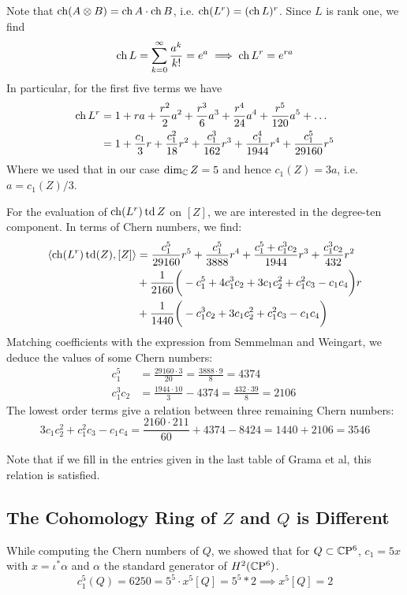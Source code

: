 \documentclass{scrartcl}
\begin{document}
Note that $\operatorname{ch}(A\otimes B)=\operatorname{ch} A\cdot \operatorname{ch} B$, i.e. $\operatorname{ch} (L^r)=(\operatorname{ch} L)^r$. Since $L$ is rank one, we find
\begin{equation*}
\operatorname{ch} L=\sum_{k=0}^\infty \frac{a^k}{k!}=e^a\implies \operatorname{ch} L^r=e^{ra}
\end{equation*}
In particular, for the first five terms we have
\begin{align*}
	\operatorname{ch} L^r&=1+ra+\frac{r^2}{2}a^2+\frac{r^3}{6}a^3
	+\frac{r^4}{24}a^4+\frac{r^5}{120}a^5+\dots\\
	&=1+\frac{c_1}{3}r+\frac{c_1^2}{18}r^2+\frac{c_1^3}{162}r^3
	+\frac{c_1^4}{1944}r^4+\frac{c_1^5}{29160}r^5
\end{align*}
Where we used that in our case $\dim_{\mathbb{C}} Z=5$ and hence $c_1(Z)=3a$, i.e. $a=c_1(Z)/3$.

For the evaluation of $\operatorname{ch}(L^r)\operatorname{td} Z$ on $[Z]$, we are interested in the degree-ten component. In terms of Chern numbers, we find:
\begin{align*}
	\langle \operatorname{ch}(L^r)\operatorname{td}(Z),[Z]\rangle&=\frac{c_1^5}{29160}r^5+\frac{c_1^5}{3888}r^4
	+\frac{c_1^5+c_1^3c_2}{1944}r^3+\frac{c_1^3c_2}{432}r^2\\
	&+\frac{1}{2160}\bigg(-c_1^5+4c_1^3c_2+3c_1c_2^2
	+c_1^2c_3-c_1c_4\bigg)r\\
	&+\frac{1}{1440}\bigg(-c_1^3c_2+3c_1c_2^2+c_1^2c_3-c_1c_4\bigg)
\end{align*}
Matching coefficients with the expression from Semmelman and Weingart, we deduce the values of some Chern numbers:
\begin{align*}
	c_1^5&=\frac{29160\cdot 3}{20}=\frac{3888\cdot 9}{8}=4374\\
	c_1^3c_2&=\frac{1944\cdot 10}{3}-4374=\frac{432\cdot 39}{8}=2106\
\end{align*}
The lowest order terms give a relation between three remaining Chern numbers:
\begin{equation*}
	3c_1c_2^2+c_1^2c_3-c_1c_4=\frac{2160\cdot 211}{60}+4374-8424=1440+2106=3546
\end{equation*}

Note that if we fill in the entries given in the last table of Grama et al, this relation is satisfied.

\subsection{The Cohomology Ring of $Z$ and $Q$ is Different}

While computing the Chern numbers of $Q$, we showed that for $Q\subset \mathbb{C}\mathrm{P}^6$, $c_1=5x$ with $x=\iota^*\alpha$ and $\alpha$ the standard generator of $H^2(\mathbb{C}\mathrm{P}^6)$. 
\begin{equation*}
	c_1^5(Q)=6250=5^5\cdot x^5[Q]=5^5*2\implies x^5[Q]=2
\end{equation*}
\end{document}
